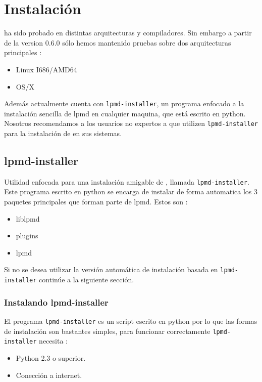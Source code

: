 \chapter{Instalaci\'on}
\label{chap:inst}

{\lpmd} ha sido probado en distintas arquitecturas y compiladores. Sin embargo a partir de la version 0.6.0 s\'olo hemos mantenido pruebas sobre dos arquitecturas principales :

\begin{itemize}
 \item Linux I686/AMD64
 \item OS/X
\end{itemize}

Adem\'as actualmente {\lpmd} cuenta con \verb|lpmd-installer|, un programa enfocado a la instalaci\'on sencilla de lpmd en cualquier maquina, que est\'a escrito en python. Nosotros recomendamos a los usuarios no expertos a que utilizen \verb|lpmd-installer| para la instalaci\'on de {\lpmd} en sus sistemas.

\section{lpmd-installer}

Utilidad enfocada para una instalación amigable de {\lpmd}, llamada \verb|lpmd-installer|. Este programa escrito en python se encarga de instalar de forma automatica los 3 paquetes principales que forman parte de lpmd. Estos son :

\begin{itemize}
 \item liblpmd
 \item plugins
 \item lpmd
\end{itemize}

Si no se desea utilizar la versi\'on autom\'atica de instalaci\'on basada en \verb|lpmd-installer| contin\'ue a la siguiente secci\'on.

\subsection{Instalando lpmd-installer}

El programa \verb|lpmd-installer| es un script escrito en python por lo que las formas de instalaci\'on son bastantes simples, para funcionar correctamente \verb|lpmd-installer| necesita :

\begin{itemize}
\item Python 2.3 o superior.
\item Conecci\'on a internet.
\end{itemize}

